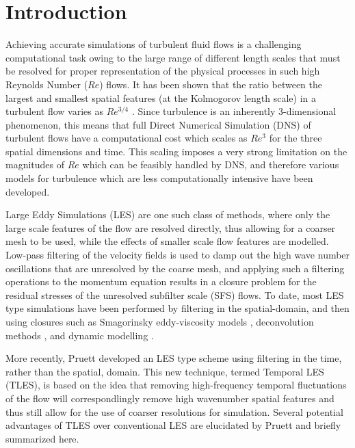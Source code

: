 \chapter{Introduction}


Achieving accurate simulations of turbulent fluid flows is a challenging computational task owing to the large range of different length scales that must be resolved for proper representation of the physical processes in such high Reynolds Number ($Re$) flows. It has been shown that the ratio between the largest and smallest spatial features (at the Kolmogorov length scale) in a turbulent flow varies as $Re^{3/4}$ \cite{Pruett2008}. Since turbulence is an inherently 3-dimensional phenomenon, this means that full Direct Numerical Simulation (DNS) of turbulent flows have a computational cost which scales as $Re^3$ for the three spatial dimensions and time. This scaling imposes a very strong limitation on the magnitudes of $Re$ which can be feasibly handled by DNS, and therefore various models for turbulence which are less computationally intensive have been developed.

Large Eddy Simulations (LES) are one such class of methods, where only the large scale features of the flow are resolved directly, thus allowing for a coarser mesh to be used, while the effects of smaller scale flow features are modelled. Low-pass filtering of the velocity fields is used to damp out the high wave number oscillations that are unresolved by the coarse mesh, and applying such a filtering operations to the momentum equation results in a closure problem for the residual stresses of the unresolved subfilter scale (SFS) flows. To date, most LES type simulations have been performed by filtering in the spatial-domain, and then using closures such as Smagorinsky eddy-viscosity models \cite{Smagorinsky1963}, deconvolution methods \cite{Stolz1999}, and dynamic modelling \cite{Germano1991}.

More recently, Pruett \cite{Pruett2000} developed an LES type scheme using filtering in the time, rather than the spatial, domain. This new technique, termed Temporal LES (TLES), is based on the idea that removing high-frequency temporal fluctuations of the flow will correspondlingly remove high wavenumber spatial features and thus still allow for the use of coarser resolutions for simulation. Several potential advantages of TLES over conventional LES are elucidated by Pruett \cite{Pruett2008} and briefly summarized here.

